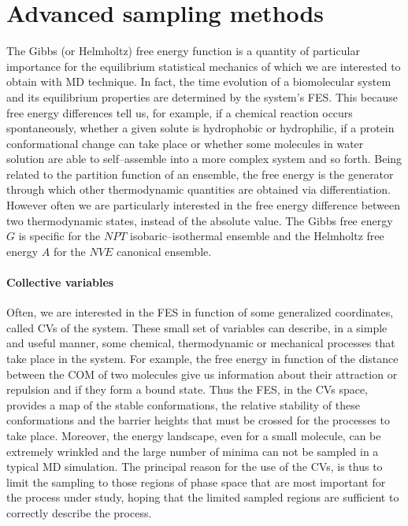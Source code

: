 \section{Advanced sampling methods}
The Gibbs (or Helmholtz) free energy function is a quantity of particular importance for the equilibrium 
statistical mechanics of which we are interested to obtain with \ac{MD} technique. In fact, the time evolution of 
a biomolecular system and its equilibrium properties are determined by the system's \ac{FES}. This because free 
energy differences tell us, for example, if a chemical reaction occurs spontaneously, whether a given solute is 
hydrophobic or hydrophilic, if a protein conformational change can take place or whether some molecules in water 
solution are able to self--assemble into a more complex system and so forth. Being related to the partition 
function of an ensemble, the free energy is the generator through which other thermodynamic quantities are 
obtained via differentiation. However often we are particularly interested in the free energy difference between 
two thermodynamic states, instead of the absolute value. The Gibbs free energy $G$ is specific for the $NPT$ 
isobaric--isothermal ensemble and the Helmholtz free energy $A$ for the $NVE$ canonical ensemble. 

\paragraph{\textbf{Collective variables}} Often, we are interested in the \ac{FES} in function of some 
generalized coordinates, called \acp{CV} of the system. These small set of variables can describe, in a simple 
and useful manner, some chemical, thermodynamic or mechanical processes that take place in the system. For 
example, the free energy in function of the distance between the \ac{COM} of two molecules give us information 
about their attraction or repulsion and if they form a bound state. Thus the \ac{FES}, in the \acp{CV} space, 
provides a map of the stable conformations, the relative stability of these conformations and the barrier heights 
that must be crossed for the processes to take place. Moreover, the energy landscape, even for a small molecule, 
can be extremely wrinkled and the large number of minima can not be sampled in a typical \ac{MD} simulation. The 
principal reason for the use of the \acp{CV}, is thus to limit the sampling to those regions of phase space that 
are most important for the process under study, hoping that the limited sampled regions are sufficient to 
correctly describe the process.

